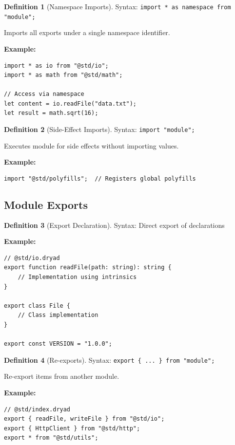 \documentclass[12pt,a4paper]{article}
\theoremstyle{definition}
\newtheorem{definition}{Definition}[section]
\begin{document}
\begin{definition}[Namespace Imports]
Syntax: \texttt{import * as namespace from "module";}

Imports all exports under a single namespace identifier.

\textbf{Example:}
\begin{lstlisting}[language=Dryad]
import * as io from "@std/io";
import * as math from "@std/math";

// Access via namespace
let content = io.readFile("data.txt");
let result = math.sqrt(16);
\end{lstlisting}
\end{definition}

\begin{definition}[Side-Effect Imports]
Syntax: \texttt{import "module";}

Executes module for side effects without importing values.

\textbf{Example:}
\begin{lstlisting}[language=Dryad]
import "@std/polyfills";  // Registers global polyfills
\end{lstlisting}
\end{definition}

\subsection{Module Exports}

\begin{definition}[Export Declaration]
Syntax: Direct export of declarations

\textbf{Example:}
\begin{lstlisting}[language=Dryad]
// @std/io.dryad
export function readFile(path: string): string {
    // Implementation using intrinsics
}

export class File {
    // Class implementation
}

export const VERSION = "1.0.0";
\end{lstlisting}
\end{definition}

\begin{definition}[Re-exports]
Syntax: \texttt{export \{ ... \} from "module";}

Re-export items from another module.

\textbf{Example:}
\begin{lstlisting}[language=Dryad]
// @std/index.dryad
export { readFile, writeFile } from "@std/io";
export { HttpClient } from "@std/http";
export * from "@std/utils";
\end{lstlisting}
\end{definition}
\end{document}
